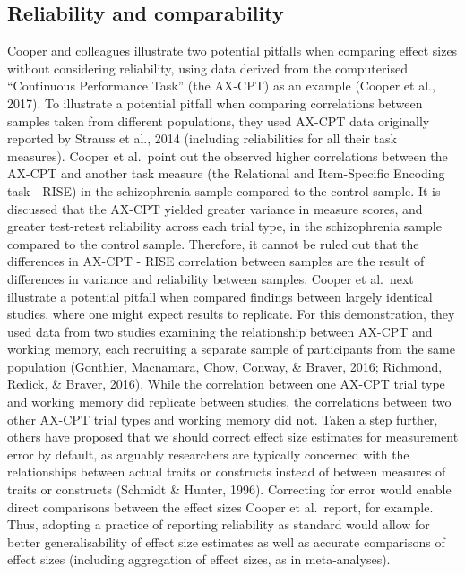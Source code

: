 \documentclass[english,,man,floatsintext]{apa6}
\begin{document}
\hypertarget{reliability-and-comparability}{%
\subsection{Reliability and comparability}\label{reliability-and-comparability}}

Cooper and colleagues illustrate two potential pitfalls when comparing effect sizes without considering reliability, using data derived from the computerised \enquote{Continuous Performance Task} (the AX-CPT) as an example (Cooper et al., 2017). To illustrate a potential pitfall when comparing correlations between samples taken from different populations, they used AX-CPT data originally reported by Strauss et al., 2014 (including reliabilities for all their task measures). Cooper et al.~point out the observed higher correlations between the AX-CPT and another task measure (the Relational and Item-Specific Encoding task - RISE) in the schizophrenia sample compared to the control sample. It is discussed that the AX-CPT yielded greater variance in measure scores, and greater test-retest reliability across each trial type, in the schizophrenia sample compared to the control sample. Therefore, it cannot be ruled out that the differences in AX-CPT - RISE correlation between samples are the result of differences in variance and reliability between samples. Cooper et al.~next illustrate a potential pitfall when compared findings between largely identical studies, where one might expect results to replicate. For this demonstration, they used data from two studies examining the relationship between AX-CPT and working memory, each recruiting a separate sample of participants from the same population (Gonthier, Macnamara, Chow, Conway, \& Braver, 2016; Richmond, Redick, \& Braver, 2016). While the correlation between one AX-CPT trial type and working memory did replicate between studies, the correlations between two other AX-CPT trial types and working memory did not. Taken a step further, others have proposed that we should correct effect size estimates for measurement error by default, as arguably researchers are typically concerned with the relationships between actual traits or constructs instead of between measures of traits or constructs (Schmidt \& Hunter, 1996). Correcting for error would enable direct comparisons between the effect sizes Cooper et al.~report, for example. Thus, adopting a practice of reporting reliability as standard would allow for better generalisability of effect size estimates as well as accurate comparisons of effect sizes (including aggregation of effect sizes, as in meta-analyses).
\end{document}
